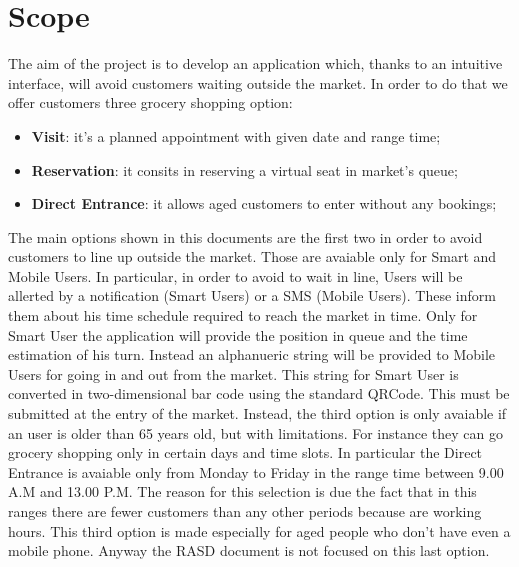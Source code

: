  
\section{Scope}

The aim of the project is to develop an application which, thanks to an intuitive interface, will avoid customers waiting outside the market.
In order to do that we offer customers three grocery shopping option: 

\begin{itemize}
\item \textbf{Visit}: it's a planned appointment with given date and range time;
\item \textbf{Reservation}: it consits in reserving a virtual seat in market's queue;
\item \textbf{Direct Entrance}: it allows aged customers to enter without any bookings;
\end{itemize}
The main options shown in this documents are the first two in order to avoid customers to line up outside the market. Those are avaiable only for Smart and Mobile Users.
In particular, in order to avoid to wait in line, Users will be allerted by a notification (Smart Users) or a SMS (Mobile Users). These inform them about his time schedule required to reach the market in time.
Only for Smart User the application will provide the position in queue and the time estimation of his turn.
Instead an alphanueric string will be provided to Mobile Users for going in and out from the market. This string for Smart User is converted in two-dimensional bar code using the standard QRCode. This must be submitted at the entry of the market.
Instead, the third option is only avaiable if an user is older than 65 years old, but with limitations. For instance they can go grocery shopping only in certain days and time slots. 
In particular the Direct Entrance is avaiable only from Monday to Friday in the range time between 9.00 A.M and 13.00 P.M. The reason for this selection is due the fact that in this ranges there are fewer customers than any other periods because are working hours. This third option is made especially for aged people who don't have even a mobile phone. Anyway the RASD document is not focused on this last option.




